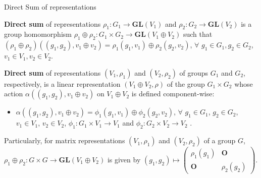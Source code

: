 \documentclass{beamer}
\newcommand\boldtext[1]{\textcolor{bolds}{\textbf{#1}}}
\begin{document}
\begin{frame}{Direct Sum of representations}
    \begin{definition}[1]
        \boldtext{Direct sum} of representations $\rho_1:G_1\xrightarrow{}\mathbf{GL}(V_1)$ and $\rho_2:G_2\xrightarrow{}\mathbf{GL}(V_2)$ is a group homomorphism $\rho_1\oplus\rho_2:G_1\times G_2\xrightarrow{}\mathbf{GL}(V_1\oplus V_2)$ such that $(\rho_1\oplus\rho_2)((g_1,g_2),v_1\oplus v_2)=\rho_1(g_1,v_1)\oplus\rho_2(g_2,v_2)$, $\forall$ $g_1 \in G_1, g_2 \in G_2$, $v_1\in V_1, v_2\in V_2$.
    \end{definition}
    \begin{definition}[2]
        \boldtext{Direct sum} of representations $(V_1,\rho_1)$ and $(V_2,\rho_2)$ of groups $G_1$ and $G_2$, respectively, is a linear representation $(V_1\oplus V_2,\rho)$ of the group $G_1\times G_2$ whose action $\alpha((g_1,g_2),v_1\oplus v_2)$ on $V_1\oplus V_2$ is defined component-wise:
        \begin{itemize}
            \item $\alpha((g_1,g_2),v_1\oplus v_2)=\phi_1(g_1,v_1)\oplus\phi_2(g_2,v_2)$, $\forall$ $g_1 \in G_1$, $g_2 \in G_2$, $v_1\in V_1$, $v_2\in V_2$, $\phi_1:G_1\times V_1\xrightarrow{}V_1$ and $\phi_2:G_2\times V_2\xrightarrow{}V_2$ .
        \end{itemize}
    \end{definition}
    Particularly, for matrix representations $(V_1,\rho_1)$ and $(V_2,\rho_2)$ of a group $G$, $\rho_1\oplus\rho_2:G\times G\xrightarrow{}\mathbf{GL}(V_1\oplus V_2)$ is given by $(g_1,g_2)\mapsto
    \begin{pmatrix}
    \rho_1(g_1) & \mathbf{O} \\ 
    \mathbf{O} & \rho_2(g_2)
    \end{pmatrix}$.
\end{frame}
\end{document}
